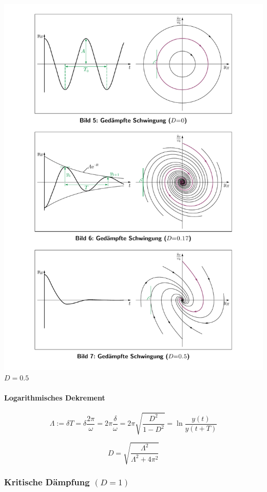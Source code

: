 \documentclass[9pt,fleqn,ngerman,article]{memoir}
\begin{document}
\begin{multicols*}{3}
\begin{center}
						\includegraphics[width=\columnwidth]{grafiken/daempfung_d_0_1_2}
						$D = 0.5$
					\end{center}
					
					\paragraph{Logarithmisches Dekrement} %
						\[
							\Lambda := \delta T = \delta \frac{2 \pi}{\omega} = 2 \pi \frac{\delta}{\omega} = 2\pi \sqrt{\frac{D^2}{1-D^2}} = \ln \frac{y(t)}{y(t+T)}
						\]
						
						\[
							D = \sqrt{\frac{\Lambda^2}{\Lambda^2 + 4\pi^2}}
						\]
				
				\subsubsection{Kritische Dämpfung $(D = 1)$} %
					

\end{multicols*}
\end{document}
